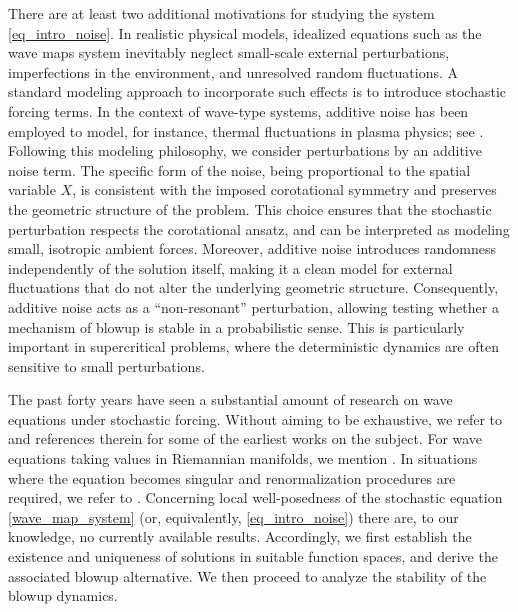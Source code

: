 \documentclass[12pt,reqno]{amsart}
\theoremstyle{plain}
\theoremstyle{remark}
\theoremstyle{plain}
\theoremstyle{definition}
\numberwithin{equation}{section}
\numberwithin{equation}{section}
\begin{document}
	There are at least two additional motivations for studying the system \eqref{eq_intro_noise}. In realistic physical models, idealized equations such as the wave maps system inevitably neglect small-scale external perturbations, imperfections in the environment, and unresolved random fluctuations. A standard modeling approach to incorporate such effects is to introduce stochastic forcing terms. In the context of wave-type systems, additive noise has been employed to model, for instance, thermal fluctuations in plasma physics; see \cite{herr2023three}. Following this modeling philosophy, we consider perturbations by an additive noise term. The specific form of the noise, being proportional to the spatial variable $X$, is consistent with the imposed corotational symmetry and preserves the geometric structure of the problem. This choice ensures that the stochastic perturbation respects the corotational ansatz, and can be interpreted as modeling small, isotropic ambient forces. Moreover, additive noise introduces randomness independently of the solution itself, making it a clean model for external fluctuations that do not alter the underlying geometric structure. Consequently, additive noise acts as a ``non-resonant'' perturbation, allowing testing whether a mechanism of blowup is stable in a probabilistic sense. This is particularly important in supercritical problems, where the deterministic dynamics are often sensitive to small perturbations.
	
	
	The past forty years have seen a substantial amount of research on wave equations under stochastic forcing. Without aiming to be exhaustive, we refer to \cite{carmona1988random, carmona1988random2, dalang1998stochastic, peszat2000nonlinear, chow2002stochastic} and references therein for some of the earliest works on the subject. For wave equations taking values in Riemannian manifolds, we mention \cite{brzezniak2007strong, brzezniak2010stochastic}. In situations where the equation becomes singular and renormalization procedures are required, we refer to \cite{albeverio, gubinelli2018renormalization, gubinelli2022global, tolomeo}. Concerning local well-posedness of the stochastic equation \eqref{wave_map_system} (or, equivalently, \eqref{eq_intro_noise}) there are, to our knowledge, no currently available results. Accordingly, we first establish the existence and uniqueness of solutions in suitable function spaces, and derive the associated blowup alternative. We then proceed to analyze the stability of the blowup dynamics.
	
\end{document}
